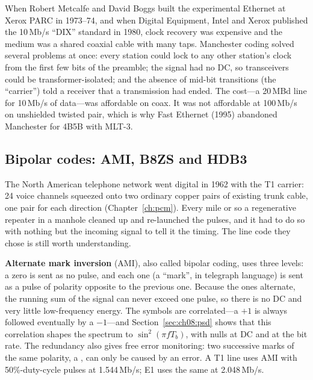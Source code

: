 \begin{history}
When Robert Metcalfe and David Boggs built the experimental Ethernet at Xerox PARC in
1973--74, and when Digital Equipment, Intel and Xerox published the 10\,Mb/s ``DIX''
standard in 1980, clock recovery was expensive and the medium was a shared coaxial cable
with many taps. Manchester coding solved several problems at once: every station could lock
to any other station's clock from the first few bits of the preamble; the signal had no DC,
so transceivers could be transformer-isolated; and the absence of mid-bit transitions
(the ``carrier'') told a receiver that a transmission had ended. The cost---a 20\,MBd line
for 10\,Mb/s of data---was affordable on coax. It was not affordable at 100\,Mb/s on
unshielded twisted pair, which is why Fast Ethernet (1995) abandoned Manchester for 4B5B
with MLT-3.
\end{history}


\subsection{Bipolar codes: AMI, B8ZS and HDB3}

The North American telephone network went digital in 1962 with the T1 carrier: 24 voice
channels squeezed onto two ordinary copper pairs of existing trunk cable, one pair for each
direction (Chapter~\ref{ch:pcm}). Every mile or so a regenerative repeater in a manhole
cleaned up and re-launched the pulses, and it had to do so with nothing but the incoming
signal to tell it the timing. The line code they chose is still worth understanding.

\textbf{Alternate mark inversion} (AMI), also called bipolar
coding, uses three levels: a zero is sent as no pulse, and each one (a ``mark'', in telegraph
language) is sent as a pulse of polarity opposite to the previous one. Because the ones
alternate, the running sum of the signal can never exceed one pulse, so there is no DC and
very little low-frequency energy. The symbols are correlated---a $+1$ is always followed
eventually by a $-1$---and Section~\ref{sec:ch08:psd} shows that this correlation shapes the
spectrum to $\sin^2(\pi fT_b)$, with nulls at DC and at the bit rate. The redundancy also gives
free error monitoring: two successive marks of the same polarity, a ,
can only be caused by an error. A T1 line uses AMI with 50\%-duty-cycle pulses at
1.544\,Mb/s; E1 uses the same at 2.048\,Mb/s.

